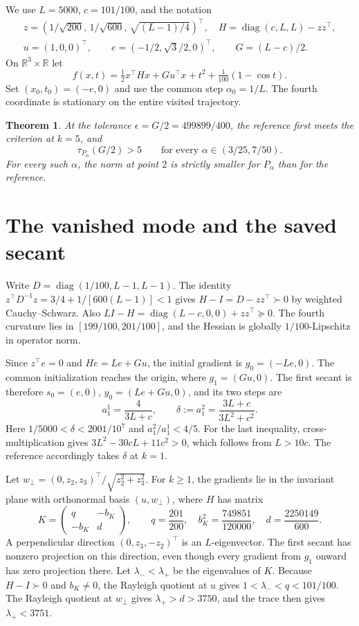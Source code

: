 \documentclass[11pt]{article}
\newtheorem{theorem}{Theorem}
\newcommand{\R}{\mathbb R}
\begin{document}
We use \(L=5000\), \(c=101/100\), and the notation
\[
 \begin{gathered}
 z=(1/\sqrt{200},\,1/\sqrt{600},\,\sqrt{(L-1)/4})^\top,\quad
 H=\operatorname{diag}(c,L,L)-zz^\top,\\
 u=(1,0,0)^\top,\qquad e=(-1/2,\sqrt3/2,0)^\top,\qquad G=(L-c)/2 .
 \end{gathered}
\]
On \(\R^3\times\R\) let
\[
 f(x,t)=\tfrac12 x^\top Hx+Gu^\top x+t^2+\tfrac1{100}(1-\cos t).
\]
Set \((x_0,t_0)=(-e,0)\) and use the common step \(\alpha_0=1/L\).
The fourth coordinate is stationary on the entire visited trajectory.

\begin{theorem}\label{thm:main}
At the tolerance \(\epsilon=G/2=499899/400\), the reference first
meets the criterion at \(k=5\), and
\[
 \tau_{P_\alpha}(G/2)>5\qquad
       \text{for every }\alpha\in(3/25,7/50).
\]
For every such \(\alpha\), the norm at point \(2\) is strictly
smaller for \(P_\alpha\) than for the reference.
\end{theorem}

\section{The vanished mode and the saved secant}

Write \(D=\operatorname{diag}(1/100,L-1,L-1)\).
The identity \(z^\top D^{-1}z=3/4+1/[600(L-1)]<1\) gives
\(H-I=D-zz^\top\succ0\) by weighted Cauchy--Schwarz.
Also \(LI-H=\operatorname{diag}(L-c,0,0)+zz^\top\succeq0\).
The fourth curvature lies in \([199/100,201/100]\), and
the Hessian is globally \(1/100\)-Lipschitz in operator norm.

Since \(z^\top e=0\) and \(He=Le+Gu\), the initial gradient is
\(g_0=(-Le,0)\). The common initialization reaches the origin,
where \(g_1=(Gu,0)\). The first secant is therefore
\(s_0=(e,0)\), \(y_0=(Le+Gu,0)\), and its two steps are
\[
 a^1_1=\frac4{3L+c},\qquad
 \delta:=a^2_1=\frac{3L+c}{3L^2+c^2}.
\]
Here \(1/5000<\delta<2001/10^7\) and \(a^2_1/a^1_1<4/5\).
For the last inequality, cross-multiplication gives
\(3L^2-30cL+11c^2>0\), which follows from \(L>10c\).
The reference accordingly takes \(\delta\) at \(k=1\).

Let \(w_\perp=(0,z_2,z_3)^\top/\sqrt{z_2^2+z_3^2}\).
For \(k\ge1\), the gradients lie in the invariant plane with
orthonormal basis \((u,w_\perp)\), where \(H\) has matrix
\[
 K=\begin{pmatrix}q&-b_K\\-b_K&d\end{pmatrix},\qquad
 q=\frac{201}{200},\quad b_K^2=\frac{749851}{120000},\quad
 d=\frac{2250149}{600}.
\]
A perpendicular direction \((0,z_3,-z_2)^\top\) is an
\(L\)-eigenvector. The first secant has nonzero projection on
this direction, even though every gradient from \(g_1\) onward
has zero projection there. Let \(\lambda_-<\lambda_+\) be the
eigenvalues of \(K\). Because \(H-I\succ0\) and \(b_K\ne0\),
the Rayleigh quotient at \(u\) gives \(1<\lambda_-<q<101/100\).
The Rayleigh quotient at \(w_\perp\) gives \(\lambda_+>d>3750\),
and the trace then gives \(\lambda_+<3751\).
\end{document}
